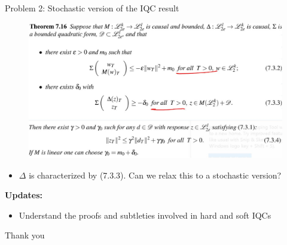 \documentclass{beamer}
\begin{document}
\begin{frame}{Problem 2: Stochastic version of the IQC result}
\begin{minipage}{0.45\textwidth}
\vspace{4cm}
\end{minipage}
\begin{minipage}{0.45\textwidth}
	\begin{figure}
		\includegraphics[width=1.35\linewidth]{figures/hard_IQC_theorem.JPG}
		\label{fig:mjlstraj}
	\end{figure}
\end{minipage}	
\begin{itemize}
	\item $\Delta$ is characterized by (7.3.3). Can we relax this to a stochastic version? 
\end{itemize}
\textbf{Updates:}
\begin{itemize}
	\item Understand the proofs and subtleties involved in hard and soft IQCs
\end{itemize}

	
\end{frame}
\begin{frame}{}
\begin{center}
    \huge{Thank you}
\end{center}
\end{frame}
\end{document}
